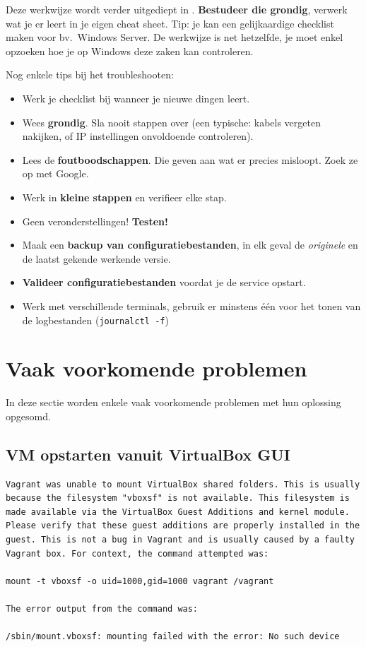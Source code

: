 Deze werkwijze wordt verder uitgediept in \textcite{VanVreckem2015}. \textbf{Bestudeer die grondig}, verwerk wat je er leert in je eigen cheat sheet. Tip: je kan een gelijkaardige checklist maken voor bv.~Windows Server. De werkwijze is net hetzelfde, je moet enkel opzoeken hoe je op Windows deze zaken kan controleren.

Nog enkele tips bij het troubleshooten:
\begin{itemize}
  \item Werk je checklist bij wanneer je nieuwe dingen leert.
  \item Wees \textbf{grondig}. Sla nooit stappen over (een typische: kabels vergeten nakijken, of IP instellingen onvoldoende controleren).
  \item Lees de \textbf{foutboodschappen}. Die geven aan wat er precies misloopt. Zoek ze op met Google.
  \item Werk in \textbf{kleine stappen} en verifieer elke stap.
  \item Geen veronderstellingen! \textbf{Testen!}
  \item Maak een \textbf{backup van configuratiebestanden}, in elk geval de \emph{originele} en de laatst gekende werkende versie.
  \item \textbf{Valideer configuratiebestanden} voordat je de service opstart.
  \item Werk met verschillende terminals, gebruik er minstens één voor het tonen van de logbestanden (\texttt{journalctl -f})
\end{itemize}

\section{Vaak voorkomende problemen}
\label{sec:problemen}

In deze sectie worden enkele vaak voorkomende problemen met hun oplossing opgesomd.

\subsection{VM opstarten vanuit VirtualBox GUI}

\begin{verbatim}
Vagrant was unable to mount VirtualBox shared folders. This is usually
because the filesystem "vboxsf" is not available. This filesystem is
made available via the VirtualBox Guest Additions and kernel module.
Please verify that these guest additions are properly installed in the
guest. This is not a bug in Vagrant and is usually caused by a faulty
Vagrant box. For context, the command attempted was:

mount -t vboxsf -o uid=1000,gid=1000 vagrant /vagrant

The error output from the command was:

/sbin/mount.vboxsf: mounting failed with the error: No such device
\end{verbatim}


